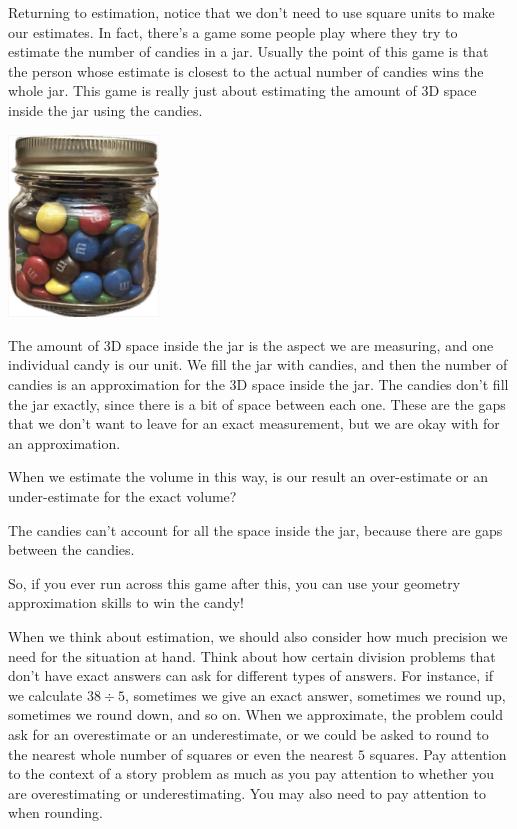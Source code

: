 \documentclass{ximera}
\begin{document}
Returning to estimation, notice that we don't need to use square units to make our estimates. In fact, there's a game some people play where they try to estimate the number of candies in a jar. Usually the point of this game is that the person whose estimate is closest to the actual number of candies wins the whole jar. This game is really just about estimating the amount of 3D space inside the jar using the candies. 
\begin{image}
\includegraphics[width=0.3\textwidth]{CandyJar.png}
\end{image}
The amount of 3D space inside the jar is the aspect we are measuring, and one individual candy is our unit. We fill the jar with candies, and then the number of candies is an approximation for the 3D space inside the jar. The candies don't fill the jar exactly, since there is a bit of space between each one. These are the gaps that we don't want to leave for an exact measurement, but we are okay with for an approximation.
\begin{question}
When we estimate the volume in this way, is our result an over-estimate or an under-estimate for the exact volume?
\begin{multipleChoice} 
\end{multipleChoice}
\begin{feedback}[correct]
The candies can't account for all the space inside the jar, because there are gaps between the candies.
\end{feedback}
\end{question} 
So, if you ever run across this game after this, you can use your geometry approximation skills to win the candy!


When we think about estimation, we should also consider how much precision we need for the situation at hand. Think about how certain division problems that don't have exact answers can ask for different types of answers. For instance, if we calculate $38 \div 5$, sometimes we give an exact answer, sometimes we round up, sometimes we round down, and so on. When we approximate, the problem could ask for an overestimate or an underestimate, or we could be asked to round to the nearest whole number of squares or even the nearest $5$ squares. Pay attention to the context of a story problem as much as you pay attention to whether you are overestimating or underestimating. You may also need to pay attention to  when rounding.
\end{document}
